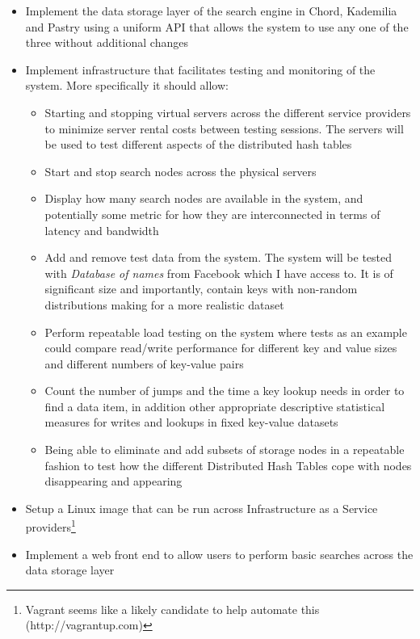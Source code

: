 \begin{itemize}
  \item Implement the data storage layer of the search engine in Chord, Kademilia and Pastry using a uniform API that allows the system to use any one of the three without additional changes
  
  \item Implement infrastructure that facilitates testing and monitoring of the system. More specifically it should allow:

  \begin{itemize}
    \item Starting and stopping virtual servers across the different service providers to minimize server rental costs between testing sessions. The servers will be used to test different aspects of the distributed hash tables
    \item Start and stop search nodes across the physical servers
    \item Display how many search nodes are available in the system, and potentially some metric for how they are interconnected in terms of latency and bandwidth
    \item Add and remove test data from the system. The system will be tested with \emph{Database of names} from Facebook which I have access to. It is of significant size and importantly, contain keys with non-random distributions making for a more realistic dataset
    \item Perform repeatable load testing on the system where tests as an example could compare read/write performance for different key and value sizes and different numbers of key-value pairs
    \item Count the number of jumps and the time a key lookup needs in order to find a data item, in addition other appropriate descriptive statistical measures for writes and lookups in fixed key-value datasets
    \item Being able to eliminate and add subsets of storage nodes in a repeatable fashion to test how the different Distributed Hash Tables cope with nodes disappearing and appearing
  \end{itemize}

  \item Setup a Linux image that can be run across Infrastructure as a Service providers\footnote{Vagrant seems like a likely candidate to help automate this (http://vagrantup.com)}

  \item Implement a web front end to allow users to perform basic searches across the data storage layer

\end{itemize}

